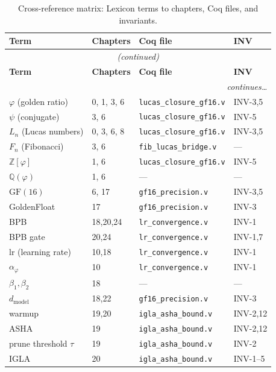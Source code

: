 \begin{longtable}{p{3.6cm} p{2.0cm} p{3.5cm} p{1.6cm}}
\caption{Cross-reference matrix: Lexicon terms to chapters, Coq files, and invariants.}
\label{tab:xref-matrix}\\
\toprule
\textbf{Term} & \textbf{Chapters} & \textbf{Coq file} & \textbf{INV} \\
\midrule
\endfirsthead
\multicolumn{4}{c}{\emph{(continued)}} \\
\toprule
\textbf{Term} & \textbf{Chapters} & \textbf{Coq file} & \textbf{INV} \\
\midrule
\endhead
\midrule
\multicolumn{4}{r}{\emph{continues\ldots}} \\
\endfoot
\bottomrule
\endlastfoot
$\varphi$ (golden ratio) & 0, 1, 3, 6 & \texttt{lucas\_closure\_gf16.v} & INV-3,5 \\
$\psi$ (conjugate) & 3, 6 & \texttt{lucas\_closure\_gf16.v} & INV-5 \\
$L_n$ (Lucas numbers) & 0, 3, 6, 8 & \texttt{lucas\_closure\_gf16.v} & INV-3,5 \\
$F_n$ (Fibonacci) & 3, 6 & \texttt{fib\_lucas\_bridge.v} & --- \\
$\mathbb{Z}[\varphi]$ & 1, 6 & \texttt{lucas\_closure\_gf16.v} & INV-5 \\
$\mathbb{Q}(\varphi)$ & 1, 6 & --- & --- \\
$\mathrm{GF}(16)$ & 6, 17 & \texttt{gf16\_precision.v} & INV-3,5 \\
GoldenFloat & 17 & \texttt{gf16\_precision.v} & INV-3 \\
BPB & 18,20,24 & \texttt{lr\_convergence.v} & INV-1 \\
BPB gate & 20,24 & \texttt{lr\_convergence.v} & INV-1,7 \\
$\mathrm{lr}$ (learning rate) & 10,18 & \texttt{lr\_convergence.v} & INV-1 \\
$\alpha_\varphi$ & 10 & \texttt{lr\_convergence.v} & INV-1 \\
$\beta_1, \beta_2$ & 18 & --- & --- \\
$d_{\mathrm{model}}$ & 18,22 & \texttt{gf16\_precision.v} & INV-3 \\
warmup & 19,20 & \texttt{igla\_asha\_bound.v} & INV-2,12 \\
ASHA & 19 & \texttt{igla\_asha\_bound.v} & INV-2,12 \\
prune threshold $\tau$ & 19 & \texttt{igla\_asha\_bound.v} & INV-2 \\
IGLA & 20 & \texttt{igla\_asha\_bound.v} & INV-1--5 \\

\end{longtable}
